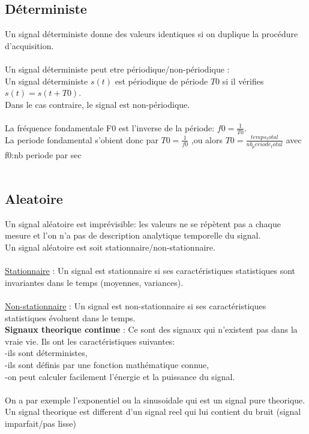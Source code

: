 \documentclass[a4paper,8pt,openany]{book}
\begin{document}
\subsection{D\'eterministe}
Un signal d\'eterministe donne des valeurs identiques si on duplique la proc\'edure d’acquisition.\\
\\
Un signal d\'eterministe peut etre p\'eriodique/non-p\'eriodique : \\
Un signal d\'eterministe $s(t)$ est p\'eriodique de p\'eriode $T0$ si il v\'erifies $s(t)=s(t+T0)$.\\
Dans le cas contraire, le signal est non-p\'eriodique.\\
\\
La fr\'equence fondamentale F0 est l’inverse de la p\'eriode: $f0=\frac{1}{T0}$. \\
La periode fondamental s'obient donc par $T0=\frac{1}{f0}$ ,ou alors  $T0=\frac{temps_total}{nb_periode_total}$ avec f0:nb periode par sec\\
\\

\subsection{Aleatoire}

Un signal al\'eatoire est impr\'evisible: les valeurs ne se répètent pas a chaque mesure et l’on n’a pas de description analytique temporelle du signal.\\
Un signal al\'eatoire est soit stationnaire/non-stationnaire.\\
\\
\underline{Stationnaire} : Un signal est stationnaire si ses caractéristiques statistiques sont invariantes dans le temps (moyennes, variances).\\
\\
\underline{Non-stationnaire} : Un signal est non-stationnaire si ses caractéristiques statistiques évoluent dans le temps.\\

\textbf{Signaux theorique continue} : Ce sont des signaux qui n’existent pas dans la vraie vie. Ils ont les
caractéristiques suivantes:\\
-ils sont déterministes,\\
-ils sont définis par une fonction mathématique connue,\\
-on peut calculer facilement l’énergie et la puissance du signal.\\
\\
On a par exemple l'exponentiel ou la sinusoidale qui est un signal pure theorique.\\
Un signal theorique est different d'un signal reel qui lui contient du bruit (signal imparfait/pas lisse)\\
\end{document}
